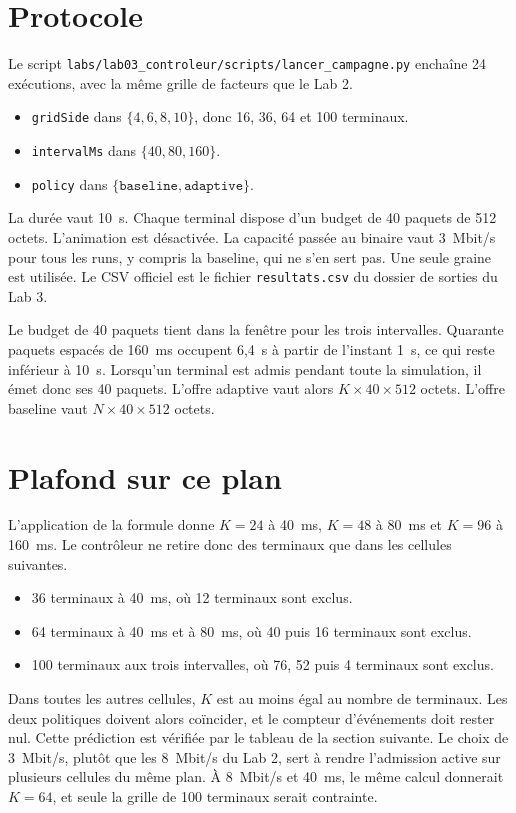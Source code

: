 \documentclass[11pt,a4paper]{article}
\begin{document}
\section{Protocole}

Le script \texttt{labs/lab03\_controleur/scripts/lancer\_campagne.py} enchaîne 24 exécutions, avec la même grille de facteurs que le Lab 2.
\begin{itemize}
  \item \texttt{gridSide} dans $\{4, 6, 8, 10\}$, donc 16, 36, 64 et 100 terminaux.
  \item \texttt{intervalMs} dans $\{40, 80, 160\}$.
  \item \texttt{policy} dans $\{\texttt{baseline}, \texttt{adaptive}\}$.
\end{itemize}

La durée vaut 10~s. Chaque terminal dispose d'un budget de 40 paquets de 512 octets. L'animation est désactivée. La capacité passée au binaire vaut 3~Mbit/s pour tous les runs, y compris la baseline, qui ne s'en sert pas. Une seule graine est utilisée. Le CSV officiel est le fichier \texttt{resultats.csv} du dossier de sorties du Lab 3.

Le budget de 40 paquets tient dans la fenêtre pour les trois intervalles. Quarante paquets espacés de 160~ms occupent 6,4~s à partir de l'instant 1~s, ce qui reste inférieur à 10~s. Lorsqu'un terminal est admis pendant toute la simulation, il émet donc ses 40 paquets. L'offre adaptive vaut alors $K \times 40 \times 512$ octets. L'offre baseline vaut $N \times 40 \times 512$ octets.

\section{Plafond sur ce plan}

L'application de la formule donne $K = 24$ à 40~ms, $K = 48$ à 80~ms et $K = 96$ à 160~ms. Le contrôleur ne retire donc des terminaux que dans les cellules suivantes.
\begin{itemize}
  \item 36 terminaux à 40~ms, où 12 terminaux sont exclus.
  \item 64 terminaux à 40~ms et à 80~ms, où 40 puis 16 terminaux sont exclus.
  \item 100 terminaux aux trois intervalles, où 76, 52 puis 4 terminaux sont exclus.
\end{itemize}

Dans toutes les autres cellules, $K$ est au moins égal au nombre de terminaux. Les deux politiques doivent alors coïncider, et le compteur d'événements doit rester nul. Cette prédiction est vérifiée par le tableau de la section suivante. Le choix de 3~Mbit/s, plutôt que les 8~Mbit/s du Lab 2, sert à rendre l'admission active sur plusieurs cellules du même plan. À 8~Mbit/s et 40~ms, le même calcul donnerait $K = 64$, et seule la grille de 100 terminaux serait contrainte.
\end{document}
